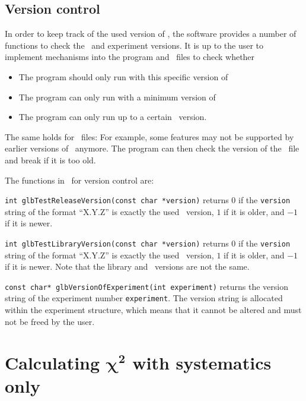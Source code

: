 \section{Version control}
\label{sec:versioning}

In order to keep track of the used version of \GLOBES , the software
provides a number of functions to check the \GLOBES\ and experiment
versions. It is up to the user to implement mechanisms into the
program and \AEDL\ files to check whether
\begin{itemize}
\item
 The program should only run with this specific version of \GLOBES
\item
 The program can only run with a minimum version of \GLOBES
\item
 The program can only run up to a certain \GLOBES\ version.
\end{itemize}
The same holds for \AEDL\ files: For example, 
some features may not be supported by earlier versions of \GLOBES\ anymore.
The program can then check the version of the \AEDL\ file and break if it is
too old.

The functions in \GLOBES\ for version control are:
\begin{function}
{\tt int glbTestReleaseVersion(const char *version)} returns $0$ if
the {\tt version} string of the format ``X.Y.Z'' is exactly the
used \GLOBES\ version, $1$ if it is older, and $-1$ if it is newer. 
\end{function}
\begin{function}
{\tt int glbTestLibraryVersion(const char *version)} returns $0$ if
the {\tt version} string of the format ``X.Y.Z'' is exactly the
used \GLOBES\ version, $1$ if it is older, and $-1$ if it is newer.
Note that the library and \GLOBES\ versions are not the same. 
\end{function}
\begin{function}
{\tt const char* glbVersionOfExperiment(int experiment)} returns
the version string of the experiment number {\tt experiment}.
The version string is allocated within the experiment structure, which means
that it cannot be altered and must not be freed by the
user.
\end{function}


\chapter[Calculating $\chi^2$ with systematics only]{Calculating $\boldsymbol{\chi^2}$ with systematics only}

